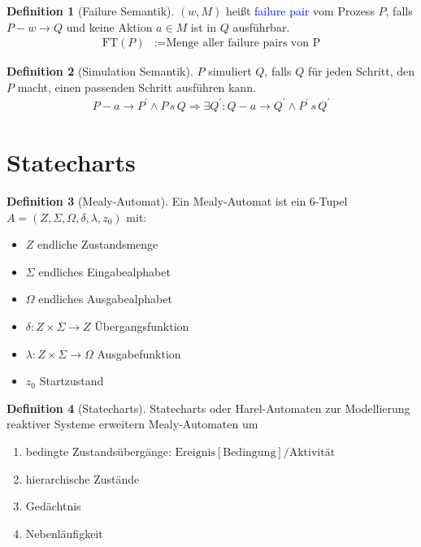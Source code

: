 \documentclass{scrreprt}
\theoremstyle{definition}
\newtheorem{Definition}{Definition}[section]
\theoremstyle{example}
\theoremstyle{algorithm}
\begin{document}
\begin{Definition}[Failure Semantik]
$(w,M)$ heißt \textcolor{blue}{failure pair} vom Prozess $P$, falls $P-w\rightarrow Q$ und keine Aktion $a\in M$ ist in $Q$ ausführbar.
\begin{align*}
\text{FT}(P)&:=\text{Menge aller failure pairs von P}
\end{align*}
\end{Definition}

\begin{Definition}[Simulation Semantik]
$P$ simuliert $Q$, falls $Q$ für jeden Schritt, den $P$ macht, einen passenden Schritt ausführen kann.
\begin{align*}
P-a\rightarrow P^\prime \land P\,s\,Q \Rightarrow \exists Q^\prime : Q-a\rightarrow Q^\prime \land P^\prime \, s\, Q^\prime
\end{align*}
\end{Definition}

\section{Statecharts}
\begin{Definition}[Mealy-Automat]
Ein Mealy-Automat ist ein 6-Tupel $A=(Z,\Sigma,\Omega,\delta,\lambda,z_0)$ mit:
\begin{itemize}
\item
$Z$ endliche Zustandsmenge
\item
$\Sigma$ endliches Eingabealphabet
\item
$\Omega$ endliches Ausgabealphabet
\item
$\delta : Z\times\Sigma\rightarrow Z$ Übergangsfunktion
\item
$\lambda : Z\times\Sigma\rightarrow\Omega$ Ausgabefunktion
\item
$z_0$ Startzustand
\end{itemize}
\end{Definition}

\begin{Definition}[Statecharts]
Statecharts oder Harel-Automaten zur Modellierung reaktiver Systeme erweitern Mealy-Automaten um
\begin{enumerate}
\item
bedingte Zustandsübergänge: $\text{Ereignis}[\text{Bedingung}]/\text{Aktivität}$
\item
hierarchische Zustände
\item
Gedächtnis
\item
Nebenläufigkeit
\end{enumerate}
\end{Definition}
\end{document}
